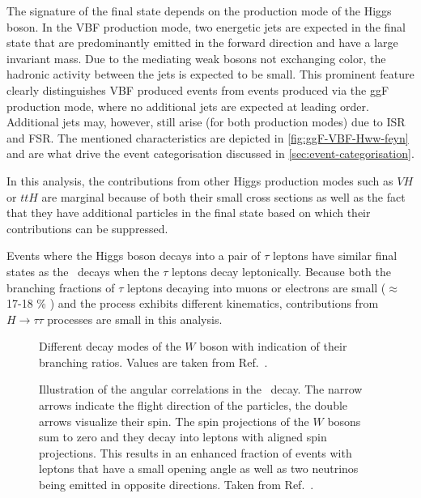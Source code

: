 The signature of the final state depends on the production mode of the Higgs boson.
In the VBF production mode, two energetic jets are expected in the final state that are predominantly emitted in the forward direction and have a large invariant mass. Due to the mediating weak bosons not exchanging color, the hadronic activity between the jets is expected to be small. 
This prominent feature clearly distinguishes VBF produced \HWW events from events produced via the ggF production mode, where no additional jets are expected at leading order. Additional jets may, however, still arise (for both production modes) due to ISR and FSR. The mentioned characteristics are depicted in \cref{fig:ggF-VBF-Hww-feyn} and are what drive the event categorisation discussed in \cref{sec:event-categorisation}. 

In this analysis, the contributions from other Higgs production modes such as $VH$ or $ttH$ are marginal because of both their small cross sections as well as the fact that they have additional particles in the final state based on which their contributions can be suppressed.

Events where the Higgs boson decays into a pair of $\tau$ leptons have similar final states as the \HWWdet\ decays when the $\tau$ leptons decay leptonically. 
Because both the branching fractions of $\tau$ leptons decaying into muons or electrons are small ($\approx$ 17-18 \% \cite{PDG2020}) and the process exhibits different kinematics, contributions from $H \to \tau\tau$ processes are small in this analysis. 


\begin{figure}
    \caption[Different decay modes of the $W$ boson with indication of their branching ratios.]{Different decay modes of the $W$ boson with indication of their branching ratios. Values are taken from Ref.~\cite{PDG2020}.}
    \label{fig:w-branching-ratios}
\end{figure}

\begin{figure}
    \caption[Angular correlations in the \HWWdet\ decay.]{Illustration of the angular correlations in the \HWWdet\ decay. The narrow arrows indicate the flight direction of the particles, the double arrows visualize their spin. The spin projections of the $W$ bosons sum to zero and they decay into leptons with aligned spin projections. This results in an enhanced fraction of events with leptons that have a small opening angle as well as two neutrinos being emitted in opposite directions. Taken from Ref.~\cite{PhysRevD.92.012006}.}
    \label{fig:spin-correlations}
\end{figure}

